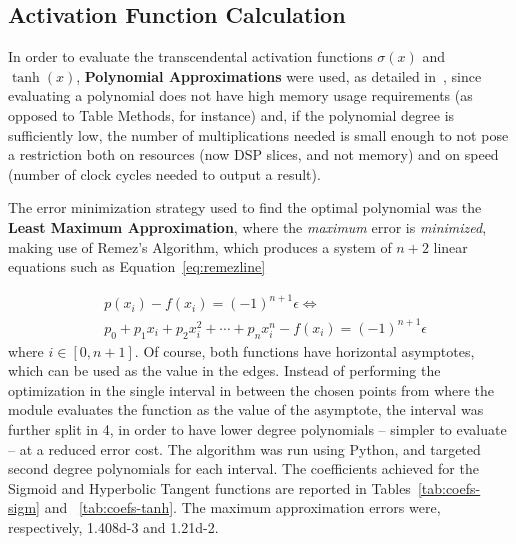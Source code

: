 \documentclass{IEEEtran}
\begin{document}
\subsection{Activation Function Calculation}\label{sec:proprarch_af}
In order to evaluate the transcendental activation functions $\sigma(x)$ and $\tanh(x)$, \textbf{Polynomial Approximations} were used, as detailed in~\cite{Muller05},
since evaluating a polynomial does not have high memory usage requirements (as opposed to Table Methods, for instance) and, if the polynomial degree is sufficiently low, the
number of multiplications needed is small enough to not pose a restriction both on resources (now DSP slices, and not memory) and on speed (number of clock cycles
needed to output a result).

The error minimization strategy used to find the optimal polynomial was the \textbf{Least Maximum Approximation}, where
the \emph{maximum} error is \emph{minimized}, making use of Remez's Algorithm, which produces a system of $n+2$ linear equations such as Equation~\ref{eq:remezline}

\begin{eqnarray}\label{eq:remezline}
    & p(x_i) - f(x_i) = (-1)^{n+1} \epsilon \Leftrightarrow  \nonumber \\
		& p_0 + p_1 x_i + p_2 x_i^2 + \cdots + p_n x_i^n - f(x_i) = (-1)^{n+1} \epsilon
\end{eqnarray}
where $i \in \left[0, n+1\right]$. Of course, both functions have horizontal asymptotes, which can be used as the value in the edges.
Instead of performing the optimization in the single interval in between the chosen points from where the module evaluates the function
as the value of the asymptote, the interval was further split in 4, in order to have lower degree polynomials -- simpler to evaluate -- at a reduced error cost.
The algorithm was run using Python, and targeted second degree polynomials for each interval. The coefficients achieved for the Sigmoid and Hyperbolic Tangent functions
are reported in Tables~\ref{tab:coefs-sigm} and ~\ref{tab:coefs-tanh}. The maximum approximation errors were, respectively, \num{1.408d-3} and \num{1.21d-2}.
\end{document}
